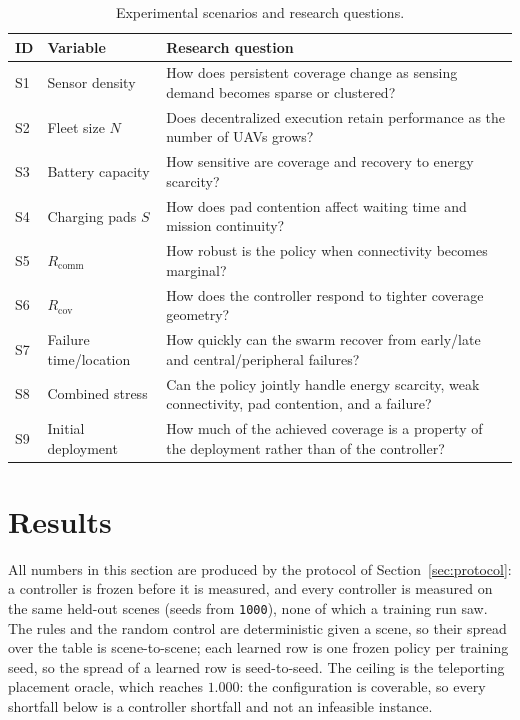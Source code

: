 \documentclass[conference]{IEEEtran}
\begin{document}
\begin{table}[t]
\caption{Experimental scenarios and research questions.}
\label{tab:scenarios}
\centering
\scriptsize
\renewcommand{\arraystretch}{1.06}
\begin{tabularx}{\columnwidth}{@{}L{0.65cm}L{1.75cm}Y@{}}
\toprule
ID & Variable & Research question \\
\midrule
S1 & Sensor density & How does persistent coverage change as sensing demand becomes sparse or clustered? \\
S2 & Fleet size $N$ & Does decentralized execution retain performance as the number of UAVs grows? \\
S3 & Battery capacity & How sensitive are coverage and recovery to energy scarcity? \\
S4 & Charging pads $S$ & How does pad contention affect waiting time and mission continuity? \\
S5 & $R_{\mathrm{comm}}$ & How robust is the policy when connectivity becomes marginal? \\
S6 & $R_{\mathrm{cov}}$ & How does the controller respond to tighter coverage geometry? \\
S7 & Failure time/location & How quickly can the swarm recover from early/late and central/peripheral failures? \\
S8 & Combined stress & Can the policy jointly handle energy scarcity, weak connectivity, pad contention, and a failure? \\
S9 & Initial deployment & How much of the achieved coverage is a property of the deployment rather than of the controller? \\
\bottomrule
\end{tabularx}
\end{table}



\section{Results}
\label{sec:results}

All numbers in this section are produced by the protocol of
Section~\ref{sec:protocol}: a controller is frozen before it is measured, and
every controller is measured on the same \tokRuleScenes{} held-out scenes
(seeds from \texttt{1000}), none of which a training run saw.  The rules and
the random control are deterministic given a scene, so their spread over the
table is scene-to-scene; each learned row is one frozen policy per training
seed, so the spread of a learned row is seed-to-seed.  The ceiling is the
teleporting placement oracle, which reaches $1.000$: the configuration is
coverable, so every shortfall below is a controller shortfall and not an
infeasible instance.
\end{document}
